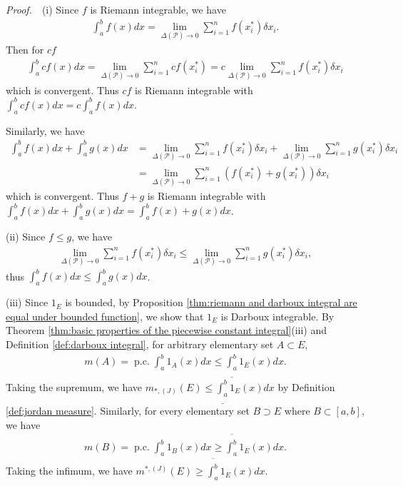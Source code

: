 \documentclass{book}
\theoremstyle{defstyle}
\theoremstyle{thmstyle}
\DeclareMathOperator{\PiecewiseConstant}{p.c.}
\newcommand{\pcint}{\PiecewiseConstant\int}
\newcommand{\JIM}{m_{*, (J)}}%
\newcommand{\JOM}{m^{*, (J)}}%
\newcommand{\pff}{\noindent\emph{Proof.}~~}
\newcounter{Proposition}[section]
\begin{document}
\pff (i) Since $f$ is Riemann integrable, we have
    \begin{align*}
        \int_{a}^{b}f(x)dx
        = \lim_{\Delta(\mathcal{P}) \to 0}\sum_{i = 1}^{n}f(x_i^*)\delta x_i.
    \end{align*}
Then for $cf$
    \begin{align*}
        \int_{a}^{b}cf(x)dx
        = \lim_{\Delta(\mathcal{P}) \to 0}\sum_{i = 1}^{n}cf(x_i^*)
        = c\lim_{\Delta(\mathcal{P}) \to 0}\sum_{i = 1}^{n}f(x_i^*)\delta x_i
    \end{align*}
which is convergent. Thus $cf$ is Riemann integrable with $\int_{a}^{b}cf(x)dx = c\int_{a}^{b}f(x)dx$.

Similarly, we have
    \begin{align*}
        \int_{a}^{b}f(x)dx + \int_{a}^{b}g(x)dx
        &= \lim_{\Delta(\mathcal{P}) \to 0}\sum_{i = 1}^{n}f(x_i^*)\delta x_i
            + \lim_{\Delta(\mathcal{P}) \to 0}\sum_{i = 1}^{n}g(x_i^*)\delta x_i\\
        &= \lim_{\Delta(\mathcal{P}) \to 0}\sum_{i = 1}^{n}(f(x_i^*) + g(x_i^*))\delta x_i
    \end{align*}
which is convergent. Thus $f + g$ is Riemann integrable with $\int_{a}^{b}f(x)dx + \int_{a}^{b}g(x)dx = \int_{a}^{b}f(x) + g(x)dx$.

(ii) Since $f \leq g$, we have
    \begin{align*}
        \lim_{\Delta(\mathcal{P}) \to 0}\sum_{i = 1}^{n}f(x_i^*)\delta x_i
        \leq \lim_{\Delta(\mathcal{P}) \to 0}\sum_{i = 1}^{n}g(x_i^*)\delta x_i,
    \end{align*}
thus $\int_{a}^{b}f(x)dx \leq \int_{a}^{b}g(x)dx$.

(iii) Since $1_E$ is bounded, by Proposition \ref{thm:riemann and darboux integral are equal under bounded function}, we show that $1_E$ is Darboux integrable. By Theorem \ref{thm:basic properties of the piecewise constant integral}(iii) and Definition \ref{def:darboux integral}, for arbitrary elementary set $A \subset E$,
    \begin{align*}
        m(A) = \pcint_{a}^{b}1_A(x)dx
        \leq \underline{\int_{a}^{b}}1_E(x)dx.
    \end{align*}
Taking the supremum, we have $\JIM(E) \leq \underline{\int_{a}^{b}}1_E(x)dx$ by Definition \ref{def:jordan measure}. Similarly, for every elementary set $B \supset E$ where $B \subset [a, b]$, we have
    \begin{align*}
        m(B) = \pcint_{a}^{b}1_B(x)dx \geq \overline{\int_{a}^{b}}1_E(x)dx.
    \end{align*}
Taking the infimum, we have $\JOM(E) \geq \overline{\int_{a}^{b}}1_E(x)dx$.
\end{document}
